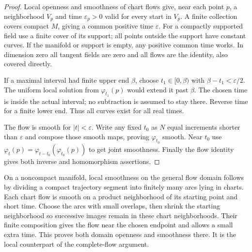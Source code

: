 \begin{proof}
Local openness and smoothness of chart flows give, near each point $p$, a neighborhood $V_p$ and time $\varepsilon_p>0$ valid for every start in $V_p$. A finite collection covers compact $M$, giving a common positive time $\varepsilon$. For a compactly supported field use a finite cover of its support; all points outside the support have constant curves. If the manifold or support is empty, any positive common time works. In dimension zero all tangent fields are zero and all flows are the identity, also covered directly.

If a maximal interval had finite upper end $\beta$, choose $t_1\in[0,\beta)$ with $\beta-t_1<\varepsilon/2$. The uniform local solution from $\varphi_{t_1}(p)$ would extend it past $\beta$. The chosen time is inside the actual interval; no subtraction is assumed to stay there. Reverse time for a finite lower end. Thus all curves exist for all real times.

The flow is smooth for $|t|<\varepsilon$. Write any fixed $t_0$ as $N$ equal increments shorter than $\varepsilon$ and compose those smooth maps, proving $\varphi_{t_0}$ smooth. Near $t_0$ use $\varphi_t(p)=\varphi_{t-t_0}(\varphi_{t_0}(p))$ to get joint smoothness. Finally the flow identity gives both inverse and homomorphism assertions.
\end{proof}

On a noncompact manifold, local smoothness on the general flow domain follows by dividing a compact trajectory segment into finitely many arcs lying in charts. Each chart flow is smooth on a product neighborhood of its starting point and short time. Choose the arcs with small overlaps, then shrink the starting neighborhood so successive images remain in these chart neighborhoods. Their finite composition gives the flow near the chosen endpoint and allows a small extra time. This proves both domain openness and smoothness there. It is the local counterpart of the complete-flow argument.

